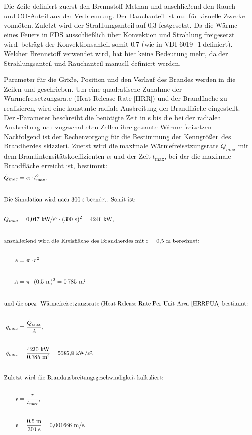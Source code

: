 Die Zeile  definiert zuerst den Brennstoff Methan und anschließend den Rauch- und CO-Anteil aus der Verbrennung. Der Rauchanteil ist nur für visuelle Zwecke vonnöten. Zuletzt wird der Strahlungsanteil auf 0,3 festgesetzt. Da die Wärme eines Feuers in FDS ausschließlich über Konvektion und Strahlung freigesetzt wird, beträgt der Konvektionsanteil somit 0,7 (wie in VDI 6019 -1 \cite[S. 27]{VDI6019B1} definiert). Welcher Brennstoff verwendet wird, hat hier keine Bedeutung mehr, da der Strahlungsanteil und Rauchanteil manuell definiert werden.

Parameter für die Größe, Position und den Verlauf des Brandes werden in die Zeilen  und  geschrieben. Um eine quadratische Zunahme der Wärmefreisetzungsrate (Heat Release Rate [HRR]) und der Brandfläche zu realisieren, wird eine konstante radiale Ausbreitung der Brandfläche eingestellt. Der -Parameter beschreibt die benötigte Zeit in s bis die bei der radialen Ausbreitung neu zugeschalteten Zellen ihre gesamte Wärme freisetzen.
Nachfolgend ist der Rechenvorgang für die Bestimmung der Kenngrößen des Brandherdes skizziert. Zuerst wird die maximale Wärmefreisetzungsrate $\Dot{Q}_{max}$ mit dem Brandintensitätskoeffizienten $\alpha$ und der Zeit $t_{\text{max}}$, bei der die maximale Brandfläche erreicht ist, bestimmt:
\begin{align}
    \Dot{Q}_{max}&=\alpha \cdot t^2_{\text{max}}. \\[20pt]
    \intertext{Die Simulation wird nach 300~s beendet. Somit ist:} \nonumber\\
    \dot{Q}_{max}&= 0{,}047~\text{kW/s²} \cdot (300~\text{s})^2 = 4240~\text{kW}, \\[20pt]
    \intertext{anschließend wird die Kreisfläche des Brandherdes mit r $=0{,}5$ m berechnet:} \nonumber\\
    A&=\pi \cdot r^2 \\[20pt]
    A&= \pi \cdot (0{,}5~\text{m})^2 = 0{,}785~\text{m²} \\[20pt]
    \intertext{und die spez. Wärmefreisetzungsrate (Heat Release Rate Per Unit Area [HRRPUA]  bestimmt:} \nonumber\\
    \dot{q}_{max}&= \frac{\Dot{Q}_{max}}{A}, \\[20pt]
    \dot{q}_{max}&= \frac{4230~\text{kW}}{0{,}785~\text{m²}} = 5385{,}8~\text{kW/s²}.\\[20pt]
    \intertext{Zuletzt wird die Brandausbreitungsgeschwindigkeit kalkuliert:} \nonumber\\
    v &= \frac{r}{t_{\text{max}}},\\[20pt]
    v &= \frac{0{,}5~\text{m}}{300~\text{s}}=0{,}001666~\text{m/s}.
\end{align}


